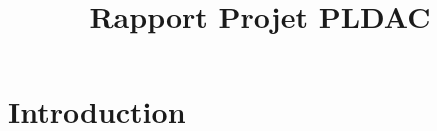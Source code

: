 \documentclass{rapport}
\title{Rapport Projet PLDAC} %
\begin{document}
        
\fairemarges %
\fairepagedegarde %
\tabledematieres


\section{Introduction}
\end{document}
